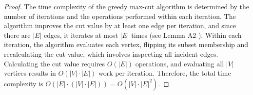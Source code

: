 \begin{proof}
    The time complexity of the greedy max-cut algorithm is determined by the number of iterations and the operations performed within each iteration. The algorithm improves the cut value by at least one edge per iteration, and since there are \(|E|\) edges, it iterates at most \(|E|\) times (see Lemma A2 \cite{sahni1976p}). Within each iteration, the algorithm evaluates each vertex, flipping its subset membership and recalculating the cut value, which involves inspecting all incident edges. Calculating the cut value requires \(O(|E|)\) operations, and evaluating all \(|V|\) vertices results in \(O(|V| \cdot |E|)\) work per iteration. Therefore, the total time complexity is \(O(|E| \cdot (|V| \cdot |E|)) = O(|V| \cdot |E|^2)\).
\end{proof}